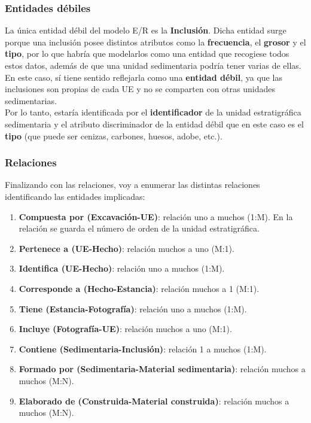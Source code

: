     \subsubsection{Entidades débiles}
    La única entidad débil del modelo E/R es la \textbf{Inclusión}. Dicha entidad surge porque
    una inclusión posee distintos atributos como la \textbf{frecuencia}, el \textbf{grosor} y
    el \textbf{tipo}, por lo que habría que modelarlos como una entidad que recogiese todos
    estos datos, además de que una unidad sedimentaria podría tener varias de ellas. En este
    caso, sí tiene sentido reflejarla como una \textbf{entidad débil}, ya que las inclusiones
    son propias de cada UE y no se comparten con otras unidades sedimentarias.\\

    Por lo tanto, estaría identificada por el \textbf{identificador} de la unidad estratigráfica
    sedimentaria y el atributo discriminador de la entidad débil que en este caso es el
    \textbf{tipo} (que puede ser cenizas, carbones, huesos, adobe, etc.).

    \subsubsection{Relaciones}
    Finalizando con las relaciones, voy a enumerar las distintas relaciones identificando las
    entidades implicadas:

        \begin{enumerate}
            \item \textbf{Compuesta por (Excavación-UE)}: relación uno a muchos (1:M). En la
            relación se guarda el número de orden de la unidad estratigráfica.
            \item \textbf{Pertenece a (UE-Hecho)}: relación muchos a uno (M:1).
            \item \textbf{Identifica (UE-Hecho)}: relación uno a muchos (1:M).
            \item \textbf{Corresponde a (Hecho-Estancia)}: relación muchos a 1 (M:1).
            \item \textbf{Tiene (Estancia-Fotografía)}: relación uno a muchos (1:M).
            \item \textbf{Incluye (Fotografía-UE)}: relación muchos a uno (M:1).
            \item \textbf{Contiene (Sedimentaria-Inclusión)}: relación 1 a muchos (1:M).
            \item \textbf{Formado por (Sedimentaria-Material sedimentaria)}: relación muchos a
            muchos (M:N).
            \item \textbf{Elaborado de (Construida-Material construida)}: relación muchos a
            muchos (M:N).
        \end{enumerate}


